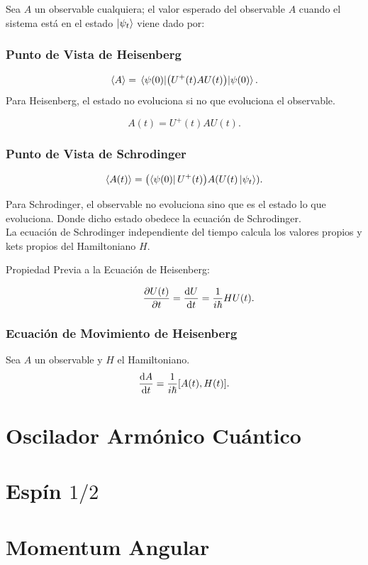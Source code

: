 Sea $A$ un observable cualquiera; el valor esperado del observable $A$ cuando el sistema está en el estado $\ket{\psi_{t} }$ viene dado por:
\subsection{Punto de Vista de Heisenberg}
	$$ \expval{A} = \expval{\qty(U^+ (t) A U (t))}{\psi (0)}. $$
Para Heisenberg, el estado no evoluciona si no que evoluciona el observable.

	$$ A(t) = U^+ (t) AU(t). $$
	
\subsection{Punto de Vista de Schrodinger}
	$$ \expval{A(t)} = \qty(\bra{\psi (0)} U^+ (t)) A \qty(U(t) \ket{\psi_{t} }). $$

Para Schrodinger, el observable no evoluciona sino que es el estado lo que evoluciona. Donde dicho estado obedece la ecuación de Schrodinger. \\
La ecuación de Schrodinger independiente del tiempo calcula los valores propios y kets propios del Hamiltoniano $H$.

\begin{description}
	\item[Propiedad Previa a la Ecuación de Heisenberg: ] 
		$$ \pdv{U(t)}{t} = \dv{U}{t} = \frac{1}{i\hbar} HU(t). $$ 
\end{description}


\subsection{Ecuación de Movimiento de Heisenberg}
Sea $A$ un observable y $H$ el Hamiltoniano.
	$$ \dv{A}{t} = \frac{1}{i\hbar} [A(t),H(t)]. $$














\chapter{Oscilador Armónico Cuántico}








\chapter{Espín $1/2$}










\chapter{Momentum Angular}



























